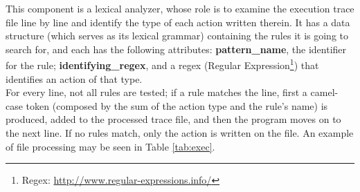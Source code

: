 This component is a lexical analyzer, whose role is to examine the execution trace file line by line and identify the type of each action written therein. It has a data structure (which serves as its lexical grammar) containing the rules it is going to search for, and each has the following attributes: \textbf{pattern\_name}, the identifier for the rule; \textbf{identifying\_regex}, and a regex (Regular Expression\footnote{Regex: \url{http://www.regular-expressions.info/}}) that identifies an action of that type. \\

For every line, not all rules are tested; if a rule matches the line, first a camel-case token (composed by the sum of the action type and the rule's name) is produced, added to the processed trace file, and then the program moves on to the next line. If no rules match, only the action is written on the file. An example of file processing may be seen in Table \ref{tab:exec}.\\

\begin{table}[!htb]
\caption{Example of an execution trace file, and of processed lines.}
\label{tab:exec1}
\end{table}

